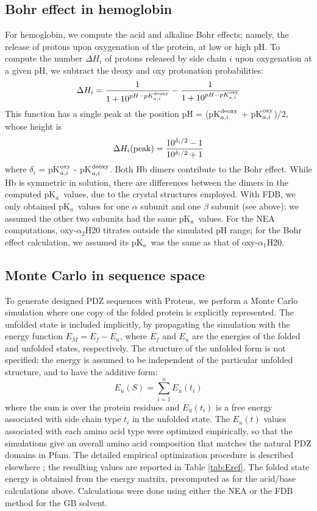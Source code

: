 \documentclass[a4paper,12pt]{article}
\newcommand{\pk}{pK$_a$}
\begin{document}
\subsection{Bohr effect in hemoglobin}
For hemoglobin, we compute the acid and alkaline Bohr effects; namely, the release of protons upon oxygenation of the
protein, at low or high pH. To compute the number $\Delta H_i$ of protons released by side chain $i$ upon oxygenation
at a given pH, we subtract the deoxy and oxy protonation probabilities:
\begin{equation}
\Delta H_i = \frac{1}{1+10^{pH-pK_{a,i}^{\rm deoxy}}} -\frac{1}{1+10^{pH-pK_{a,i}^{\rm oxy}}}  \label{eq:bohr}
\end{equation} 
This function has a single peak at the position pH = (pK$_{a,i}^{\rm deoxy}$ + pK$_{a,i}^{\rm oxy}$)/2, whose height is
\begin{equation}
\Delta H_i({\rm peak}) = \frac{10^{\delta_i/2}-1}{10^{\delta_i/2}+1}
\end{equation} 
where $\delta_i$ = pK$_{a,i}^{\rm oxy}$ - pK$_{a,i}^{\rm deoxy}$. Both Hb dimers contribute to the Bohr effect.  While Hb
is symmetric in solution, there are differences between the dimers in the computed \pk\ values, due to the crystal
structures employed. With FDB, we only obtained \pk\ values for one $\alpha$ subunit and one $\beta$ subunit (see above);
we assumed the other two subunits had the same \pk\ values. For the NEA computations, oxy-$\alpha_2$H20 titrates outside
the simulated pH range; for the Bohr effect calculation, we assumed its \pk\ was the same as that of oxy-$\alpha_1$H20. 

\subsection{Monte Carlo in sequence space}
To generate designed PDZ sequences with Proteus, we perform a Monte Carlo simulation where one copy of the folded protein
is explicitly represented. The unfolded state is included implicitly, by propagating the simulation with the energy function
$E_M = E_f - E_u$, where $E_f$ and $E_u$ are the energies of the folded and unfolded states, respectively. The structure
of the unfolded form is not specified; the energy is assumed to be independent of the particular unfolded structure,
and to have the additive form:
\begin{equation}  \label{eq:unfolded}
E_u(S) = \sum_{i=1}^n E_u(t_i)
\end{equation}
where the sum is over the protein residues and $E_u(t_i)$ is a free energy associated with side chain type $t_i$ in
the unfolded state. The $E_u(t)$ values associated with each amino acid type were optimized empirically, so that
the simulations give an overall amino acid composition that matches the natural PDZ domains in Pfam. The detailed
empirical optimization procedure is described elsewhere \cite{Mignon17}; the resullting values are reported in Table
\ref{tab:Eref}. The folded state energy is obtained from the energy matriix, precomputed as for the acid/base calculations
above. Calculations were done using either the NEA or the FDB method for the GB solvent. 
\end{document}
